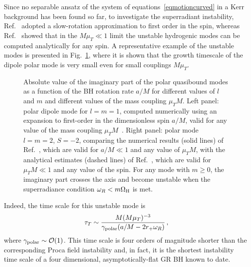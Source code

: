 \documentclass[11pt]{article}
\numberwithin{equation}{section} %
\begin{document}
Since no separable ansatz of the system of equations~\eqref{eqmotioncurved} in a Kerr background has been found so far, 
to investigate the superradiant instability, Ref.~\cite{Brito:2013wya} adopted a slow-rotation approximation to first order in the spin, whereas Ref.~\cite{Brito:2020lup} showed that in the $M\mu_T\ll 1$ limit the unstable hydrogenic modes can be computed analytically for any spin. A representative example of the unstable modes is presented in Fig.~\ref{fig:spin2}, where it is shown that the growth timescale of the dipole polar mode is very small even for small couplings $M\mu_T$.
%
\begin{figure}[htb]
\begin{center}
\caption{Absolute value of the imaginary part of the polar quasibound modes as a function of the BH rotation rate $a/M$ for different values of $l$ and $m$ and different values of the mass coupling $\mu_T M$. 
%
Left panel: polar dipole mode for $l=m=1$, computed numerically using an expansion to first-order in the dimensionless spin $a/M$, valid for any value of the mass coupling $\mu_T M$~\cite{Brito:2013wya}. Right panel: polar mode $l=m=2$, $S=-2$, comparing the numerical results (solid lines) of Ref.~\cite{Brito:2013wya}, which are valid for $a/M\ll 1$ and any value of $\mu_T M$, with the analytical estimates (dashed lines) of Ref.~\cite{Brito:2020lup}, which are valid for $\mu_T M \ll 1$ and any value of the spin.
%
For any mode with $m\geq 0$, the imaginary part crosses the axis and become unstable when the superradiance condition $\omega_R<m\Omega_{\rm H}$ is met.
\label{fig:spin2}}
\end{center}
\end{figure}
%
Indeed, the time scale for this unstable mode is~\cite{Brito:2013wya}
%
\begin{equation}
 \tau_{T}\sim \frac{M(M\mu_T)^{-3}}{\gamma_{{\rm polar}}(a/M-2r_+\omega_R)}\,,
\end{equation}
%
where $\gamma_{{\rm polar}}\sim{\cal O}(1)$. This time scale is four orders of magnitude shorter than the corresponding Proca field instability and, in fact, it is the shortest instability time scale of a four dimensional, asymptotically-flat GR BH known to date.

\end{document}
